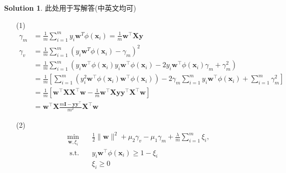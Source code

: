 \documentclass[a4paper,UTF8]{article}
\numberwithin{equation}{section}
\theoremstyle{definition}
\newtheorem*{solution}{Solution}
\begin{document}
\begin{solution}
	此处用于写解答(中英文均可)
	~\\
    \begin{enumerate}
        \item [(1)]
        \begin{equation}
            \begin{aligned} \gamma_{m} & =\frac{1}{m} \sum_{i=1}^{m} y_{i} \boldsymbol{w}^{T} \phi\left(\boldsymbol{x}_{i}\right)=\frac{1}{m} \boldsymbol{w}^{\top} \boldsymbol{X} \boldsymbol{y} \\ \gamma_{v} & =\frac{1}{m} \sum_{i=1}^{m}\left(y_{i} \boldsymbol{w}^{T} \phi\left(\boldsymbol{x}_{i}\right)-\gamma_{m}\right)^{2} \\ & =\frac{1}{m} \sum_{i=1}^{m}\left(y_{i} \boldsymbol{w}^{\top} \phi\left(\boldsymbol{x}_{i}\right) y_{i} \boldsymbol{w}^{\top} \phi\left(\boldsymbol{x}_{i}\right)-2 y_{i} \boldsymbol{w}^{\top} \phi\left(\boldsymbol{x}_{i}\right) \gamma_{m}+\gamma_{m}^{2}\right) \\ & =\frac{1}{m}\left[\sum_{i=1}^{m}\left(y_{i}^2 \boldsymbol{w}^{\top} \phi\left(\boldsymbol{x}_{i}\right) \boldsymbol{w}^{\top} \phi\left(\boldsymbol{x}_{i}\right)\right)-2 \gamma_{m} \sum_{i=1}^{m} y_{i} \boldsymbol{w}^{\top} \phi\left(\boldsymbol{x}_{i}\right)+\sum_{i=1}^{m} \gamma_{m}^{2}\right] \\ &= \frac{1}{m}\left[ \boldsymbol{w}^{\top} \boldsymbol{X} \boldsymbol{X}^{\top} \boldsymbol{w}-\frac{1}{m} \boldsymbol{w}^{\top} \boldsymbol{X} \boldsymbol{y} \boldsymbol{y}^{\top} \boldsymbol{X}^{\top} \boldsymbol{w}\right] \\ &= \boldsymbol{w}^{\top} \boldsymbol{X} \frac{m \boldsymbol{I}-\boldsymbol{y} \boldsymbol{y}^{\top}}{m^{2}} \boldsymbol{X}^{\top} \boldsymbol{w}\end{aligned}
        \end{equation}
        \item [(2)]
        \begin{equation}
            \begin{aligned} \min _{\boldsymbol{w}, \xi_{i}} \quad & \frac{1}{2}\|\boldsymbol{w}\|^{2}+\mu_{2} \gamma_{v}-\mu_{1} \gamma_{m}+\frac{\lambda}{m} \sum_{i=1}^{m} \xi_{i}, \\ \text { s.t.   }& y_{i} \boldsymbol{w}^{\top} \phi\left(\boldsymbol{x}_{i}\right) \geq 1-\xi_{i} \\ & \xi_{i} \geq 0\end{aligned}
        \end{equation}

\end{enumerate}
\end{solution}
\end{document}
